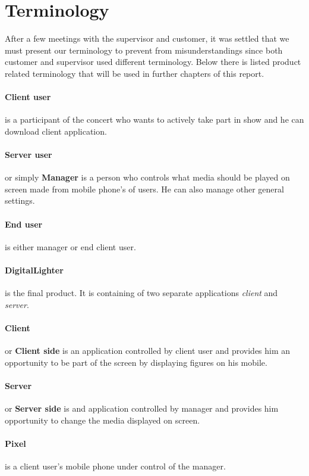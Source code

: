 \section {Terminology}
\label{sec:terminology}
After a few meetings with the supervisor and customer, it was settled that we must present our terminology to prevent from misunderstandings since both customer and supervisor used different terminology.
Below there is listed product related terminology that will be used in further chapters of this report.

\paragraph{Client user}
is a participant of the concert who wants to actively take part in show and he can download client application.

\paragraph{Server user}
or simply \textbf{Manager} is a person who controls what media should be played on screen made from mobile phone's of users. 
He can also manage other general settings.

\paragraph{End user} is either manager or end client user.

\paragraph{DigitalLighter}
is the final product. It is containing of two separate applications \emph{client} and \emph{server}.


\paragraph{Client} or \textbf{Client side} is an application controlled by client user and provides him an opportunity to be part of the screen by displaying figures on his mobile.

\paragraph{Server} or \textbf{Server side} is and application controlled by manager and provides him opportunity to change the media displayed on screen.

\paragraph{Pixel} is a client user's mobile phone under control of the manager.

